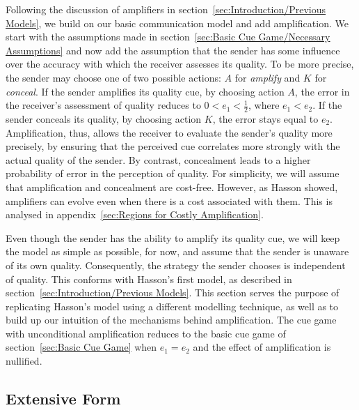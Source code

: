 \documentclass[a4paper,12pt]{article}
\numberwithin{equation}{section}
\begin{document}
Following the discussion of amplifiers in section~\ref{sec:Introduction/Previous Models}, we build on our basic communication model and add amplification. We start with the assumptions made in section~\ref{sec:Basic Cue Game/Necessary Assumptions} and now add the assumption that the sender has some influence over the accuracy with which the receiver assesses its quality. To be more precise, the sender may choose one of two possible actions: $A$ for \textit{amplify} and $K$ for \textit{conceal}. If the sender amplifies its quality cue, by choosing action $A$, the error in the receiver's assessment of quality reduces to $0<e_{1}<\frac{1}{2}$, where $e_{1}<e_{2}$. If the sender conceals its quality, by choosing action $K$, the error stays equal to $e_{2}$. Amplification, thus, allows the receiver to evaluate the sender's quality more precisely, by ensuring that the perceived cue correlates more strongly with the actual quality of the sender. By contrast, concealment leads to a higher probability of error in the perception of quality. For simplicity, we will assume that amplification and concealment are cost-free. However, as Hasson showed, amplifiers can evolve even when there is a cost associated with them. This is analysed in appendix~\ref{sec:Regions for Costly Amplification}.

Even though the sender has the ability to amplify its quality cue, we will keep the model as simple as possible, for now, and assume that the sender is unaware of its own quality. Consequently, the strategy the sender chooses is independent of quality. This conforms with Hasson's first model, as described in section~\ref{sec:Introduction/Previous Models}. This section serves the purpose of replicating Hasson's model using a different modelling technique, as well as to build up our intuition of the mechanisms behind amplification. The cue game with unconditional amplification reduces to the basic cue game of section~\ref{sec:Basic Cue Game} when $e_{1}=e_{2}$ and the effect of amplification is nullified.


\subsection{Extensive Form}
\label{sec:Cue Game with Unconditional Amplification/Extensive Form}
\end{document}
